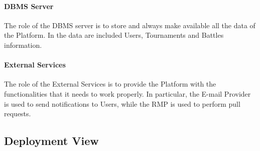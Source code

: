 \paragraph{DBMS Server}
The role of the DBMS server is to store and always make available all the data of the Platform. In the data are included Users, Tournaments and Battles information.
\newpage

\paragraph{External Services}
The role of the External Services is to provide the Platform with the functionalities that it needs to work properly. In particular, the E-mail Provider is used to send notifications to Users, while the RMP is used to perform pull requests.            
\newpage

\subsection{Deployment View}

